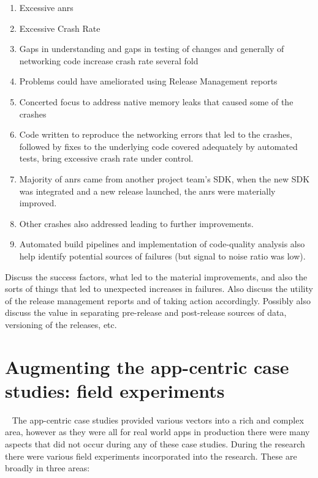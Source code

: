 \begin{enumerate}
    \item Excessive \acrshort{anr}s
    \item Excessive Crash Rate
    \item Gaps in understanding and gaps in testing of changes and generally of networking code increase crash rate several fold
    \item Problems could have ameliorated using Release Management reports
    \item Concerted focus to address native memory leaks that caused some of the crashes
    \item Code written to reproduce the networking errors that led to the crashes, followed by fixes to the underlying code covered adequately by automated tests, bring excessive crash rate under control.
    \item Majority of \acrshort{anr}s came from another project team's SDK, when the new SDK was integrated and a new release launched, the \acrshort{anr}s were materially improved. 
    \item Other crashes also addressed leading to further improvements.
    \item Automated build pipelines and implementation of code-quality analysis also help identify potential sources of failures (but signal to noise ratio was low).
\end{enumerate}

Discuss the success factors, what led to the material improvements, and also the sorts of things that led to unexpected increases in failures. Also discuss the utility of the release management reports and of taking action accordingly. Possibly also discuss the value in separating pre-release and post-release sources of data, versioning of the releases, etc.


\clearpage


\section{Augmenting the app-centric case studies: field experiments}~\label{section-field-experiments-to-augment-app-centric-case-studies}
The app-centric case studies provided various vectors into a rich and complex area, however as they were all for real world apps in production there were many aspects that did not occur during any of these case studies. During the research there were various field experiments incorporated into the research. These are broadly in three areas:

